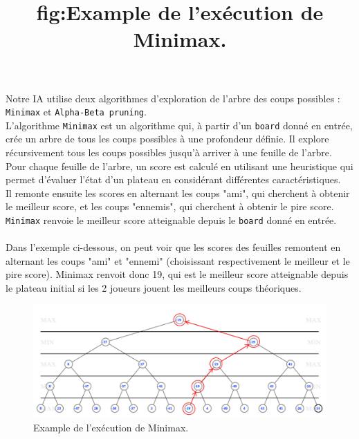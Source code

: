 \documentclass[a4paper,12pt]{article}
\begin{document}
\newpage

Notre IA utilise deux algorithmes d’exploration de l’arbre des coups possibles
: \texttt{Minimax} et \texttt{Alpha-Beta pruning}.\\

L’algorithme \texttt{Minimax} est un algorithme qui, à partir d’un
\texttt{board} donné en entrée, crée un arbre de tous les coups possibles à une
profondeur définie. Il explore récursivement tous les coups possibles jusqu’à
arriver à une feuille de l’arbre.\\ Pour chaque feuille de l’arbre, un score
est calculé en utilisant une heuristique qui permet d’évaluer l’état d’un
plateau en considérant différentes caractéristiques.\\ Il remonte ensuite les
scores en alternant les coups "ami", qui cherchent à obtenir le meilleur score,
et les coups "ennemis", qui cherchent à obtenir le pire score.\\
\texttt{Minimax} renvoie le meilleur score atteignable depuis le \texttt{board}
donné en entrée.\\ \\ Dans l'exemple ci-dessous, on peut voir que les scores
des feuilles remontent en alternant les coups "ami" et "ennemi" (choisissant
respectivement le meilleur et le pire score). Minimax renvoit donc 19, qui est
le meilleur score atteignable depuis le plateau initial si les 2 joueurs jouent
les meilleurs coups théoriques.

\begin{figure}[h]
    \centering
    \includegraphics[width=1\textwidth]{images/minimax_example.png}
    \caption{Example de l'exécution de Minimax.}
    \title{fig:Example de l'exécution de Minimax.}
\end{figure}
\end{document}
